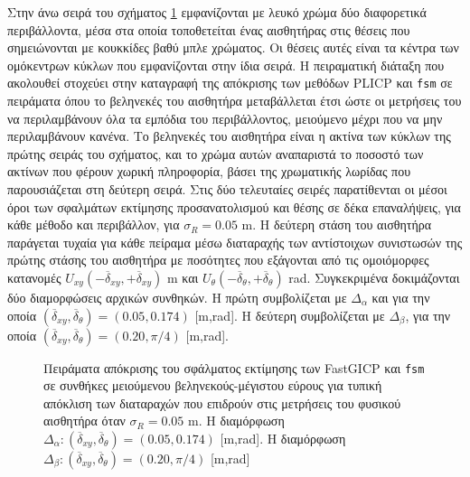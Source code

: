 Στην άνω σειρά του σχήματος \ref{fig:02_05_04:03} εμφανίζονται με λευκό χρώμα
δύο διαφορετικά περιβάλλοντα, μέσα στα οποία τοποθετείται ένας αισθητήρας στις
θέσεις που σημειώνονται με κουκκίδες βαθύ μπλε χρώματος. Οι θέσεις αυτές είναι
τα κέντρα των ομόκεντρων κύκλων που εμφανίζονται στην ίδια σειρά. Η πειραματική
διάταξη που ακολουθεί στοχεύει στην καταγραφή της απόκρισης των μεθόδων
PLICP και \texttt{fsm} σε πειράματα όπου το βεληνεκές του αισθητήρα
μεταβάλλεται έτσι ώστε οι μετρήσεις του να περιλαμβάνουν όλα τα εμπόδια του
περιβάλλοντος, μειούμενο μέχρι που να μην περιλαμβάνουν κανένα. Το βεληνεκές
του αισθητήρα είναι η ακτίνα των κύκλων της πρώτης σειράς του σχήματος, και το
χρώμα αυτών αναπαριστά το ποσοστό των ακτίνων που φέρουν χωρική πληροφορία,
βάσει της χρωματικής λωρίδας που παρουσιάζεται στη δεύτερη σειρά. Στις δύο
τελευταίες σειρές παρατίθενται οι μέσοι όροι των σφαλμάτων εκτίμησης
προσανατολισμού και θέσης σε δέκα επαναλήψεις, για κάθε μέθοδο και περιβάλλον,
για $\sigma_R = 0.05$ m.  Η δεύτερη στάση του αισθητήρα παράγεται τυχαία για
κάθε πείραμα μέσω διαταραχής των αντίστοιχων συνιστωσών της πρώτης στάσης του
αισθητήρα με ποσότητες που εξάγονται από τις ομοιόμορφες κατανομές
$U_{xy}(-\overline{\delta}_{xy},+\overline{\delta}_{xy})$ m και
$U_{\theta}(-\overline{\delta}_{\theta},+\overline{\delta}_{\theta})$ rad.
Συγκεκριμένα δοκιμάζονται δύο διαμορφώσεις αρχικών συνθηκών. H πρώτη
συμβολίζεται με $\Delta_\alpha$ και για την οποία
$(\overline{\delta}_{xy}, \overline{\delta}_{\theta}) = (0.05,0.174)$ [m,rad].
Η δεύτερη συμβολίζεται με $\Delta_\beta$, για την οποία
$(\overline{\delta}_{xy},\overline{\delta}_{\theta}) = (0.20,\pi/4)$ [m,rad].

\begin{figure}[]\centering
  
  \vspace{-2cm}
  \caption{\small Πειράματα απόκρισης του σφάλματος εκτίμησης των FastGICP
           και \texttt{fsm} σε συνθήκες μειούμενου βεληνεκούς-μέγιστου εύρους
           για τυπική απόκλιση των διαταραχών που επιδρούν στις μετρήσεις του
           φυσικού αισθητήρα όταν $\sigma_R = 0.05$ m. Η διαμόρφωση
           $\Delta_\alpha: (\overline{\delta}_{xy}, \overline{\delta}_{\theta})
           = (0.05,0.174)$ [m,rad]. Η διαμόρφωση $\Delta_\beta:
           (\overline{\delta}_{xy},\overline{\delta}_{\theta}) = (0.20,\pi/4)$
           [m,rad]}
  \label{fig:02_05_04:03}
\end{figure}

\begin{figure}[]\centering
  
  \caption{}
  \label{fig:02_05_04:04}
\end{figure}
